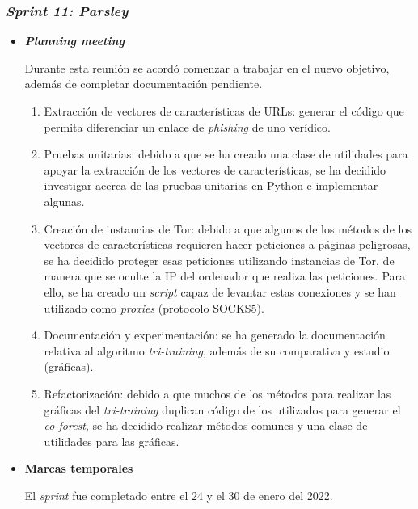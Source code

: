 \subsubsection{\textit{Sprint 11: Parsley}}
\begin{itemize}
	
	\item \textbf{\textit{Planning meeting}}
	
	Durante esta reunión se acordó comenzar a trabajar en el nuevo objetivo, además de completar documentación pendiente.
	
	\begin{enumerate}
		\item Extracción de vectores de características de URLs:  generar el código que permita diferenciar un enlace de \textit{phishing} de uno verídico.
		\item Pruebas unitarias: debido a que se ha creado una clase de utilidades para apoyar la extracción de los vectores de características, se ha decidido investigar acerca de las pruebas unitarias en Python e implementar algunas.
		\item Creación de instancias de Tor: debido a que algunos de los métodos de los vectores de características requieren hacer peticiones a páginas peligrosas, se ha decidido proteger esas peticiones utilizando instancias de Tor, de manera que se oculte la IP del ordenador que realiza las peticiones. Para ello, se ha creado un \textit{script} capaz de levantar estas conexiones y se han utilizado como \textit{proxies} (protocolo SOCKS5).
		\item Documentación y experimentación: se ha generado la documentación relativa al algoritmo \textit{tri-training}, además de su comparativa y estudio (gráficas).
		\item Refactorización: debido a que muchos de los métodos para realizar las gráficas del \textit{tri-training} duplican código de los utilizados para generar el \textit{co-forest}, se ha decidido realizar métodos comunes y una clase de utilidades para las gráficas.
		
	\end{enumerate}
	\item \textbf{Marcas temporales}	
		
	El \textit{sprint} fue completado entre el 24 y el 30 de enero del 2022.
	

\end{itemize}
